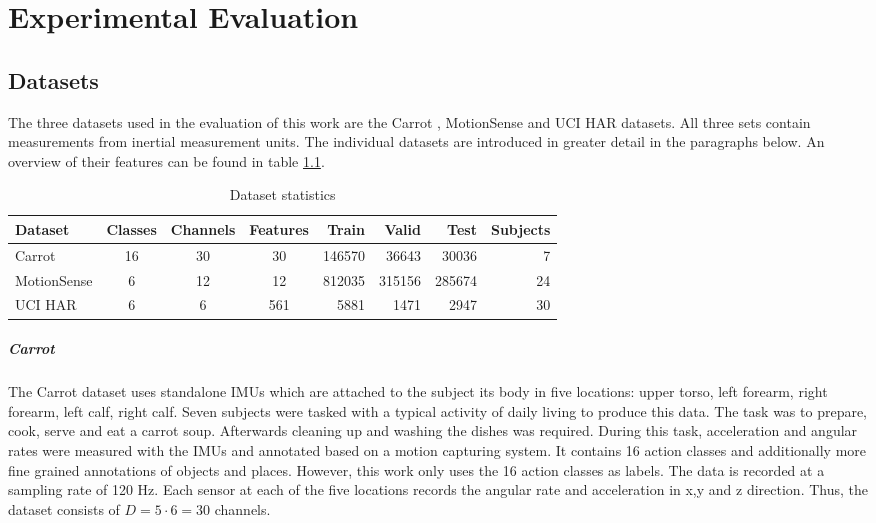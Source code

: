\documentclass[11pt,titlepage,oneside,openany]{book}
\begin{document}
\chapter{Experimental Evaluation}
\label{cha:exp}

\section{Datasets}
\label{sec:data}
The three datasets used in the evaluation of this work are the Carrot \cite{kruger_recognising_2011}, MotionSense \cite{malekzadeh_mobile_2019} and UCI HAR \cite{anguita_public_2013} datasets. All three sets contain measurements from inertial measurement units. The individual datasets are introduced in greater detail in the paragraphs below. An overview of their features can be found in table \ref{tab:sets}.

\begin{table}
	\footnotesize
	\centering
	\begin{tabularx}{\textwidth}{lcccrrrr}
		\toprule
		\textbf{Dataset} & \textbf{Classes} & \textbf{Channels} & \textbf{Features} & \textbf{Train} & \textbf{Valid} & \textbf{Test} & \textbf{Subjects} \\
		\midrule
		Carrot & 16 & 30 & 30 & 146570 & 36643 & 30036 & 7 \\
		MotionSense & 6 & 12 & 12 & 812035 & 315156 & 285674 & 24 \\
		UCI HAR & 6 & 6 & 561 & 5881 & 1471 & 2947 & 30 \\
		\bottomrule
	\end{tabularx}
	\caption[Dataset statistics]{\label{tab:sets} Dataset statistics}
\end{table}

\paragraph{Carrot}
The Carrot dataset uses standalone IMUs which are attached to the subject its body in five locations: upper torso, left forearm, right forearm, left calf, right calf. Seven subjects were tasked with a typical activity of daily living to produce this data.
The task was to prepare, cook, serve and eat a carrot soup. Afterwards cleaning up and washing the dishes was required. During this task, acceleration and angular rates were measured with the IMUs and annotated based on a motion capturing system.
It contains 16 action classes and additionally more fine grained annotations of objects and places. However, this work only uses the 16 action classes as labels. The data is recorded at a sampling rate of 120 Hz. Each sensor at each of the five locations records the angular rate and acceleration in x,y and z direction. Thus, the dataset consists of $D = 5 \cdot 6 = 30$ channels.
\end{document}
